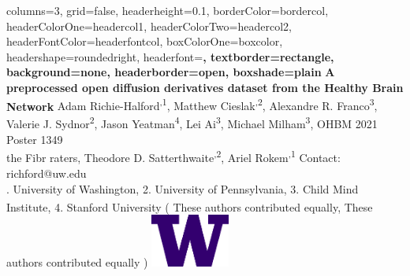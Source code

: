\documentclass[a0paper,landscape,fontscale=0.395]{baposter}
\begin{document}
\begin{poster}{
    columns=3,
    grid=false,
    headerheight=0.1\textheight,
    borderColor=bordercol, %
    headerColorOne=headercol1, %
    headerColorTwo=headercol2, %
    headerFontColor=headerfontcol, %
    boxColorOne=boxcolor, %
    headershape=roundedright, %
    headerfont=\Large\sf\bf, %
    textborder=rectangle,
    background=none,
    headerborder=open, %
    boxshade=plain
}
{}
%
%
{\sf\bf A preprocessed open diffusion derivatives dataset from the Healthy Brain Network} %
{%
    \vspace{1em}
    Adam Richie-Halford\textsuperscript{\textasteriskcentered,1}, %
    Matthew Cieslak\textsuperscript{\textasteriskcentered,2}, %
    Alexandre R. Franco\textsuperscript{3}, %
    Valerie J. Sydnor\textsuperscript{2}, %
    Jason Yeatman\textsuperscript{4}, %
    Lei Ai\textsuperscript{3}, %
    Michael Milham\textsuperscript{3}, %
    \hfill OHBM 2021 Poster 1349 \hspace{0.5em} \null \\ %
    the Fibr raters, %
    Theodore D. Satterthwaite\textsuperscript{\textasteriskcentered\textasteriskcentered,2}, %
    Ariel Rokem\textsuperscript{\textasteriskcentered\textasteriskcentered,1}%
    \hfill Contact: richford@uw.edu \hspace{0.5em} \null \\ %
    {. University of Washington, %
        2. University of Pennsylvania, %
        3. Child Mind Institute, %
        4. Stanford University %
        \hfill %
        (%
            \textsuperscript{\textasteriskcentered} These authors contributed equally, %
            \textsuperscript{\textasteriskcentered\textasteriskcentered} These authors contributed equally%
        ) \hspace{0.5em} \null%
    }
} %
{%
\includegraphics[align=c,height=1.75cm]{logos/UWlogo.png}%
}
\end{poster}
\end{document}
